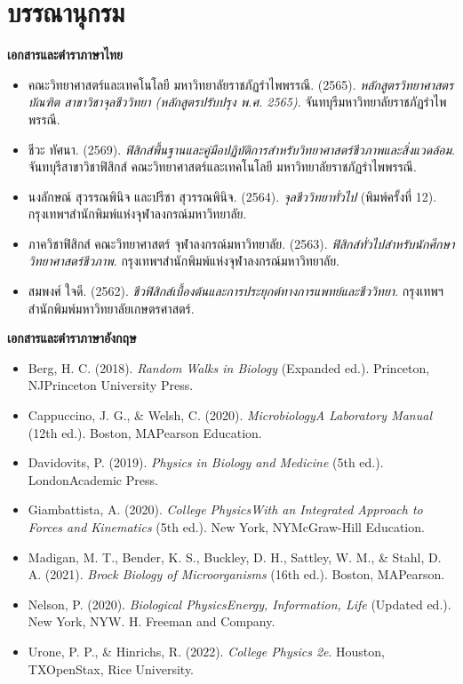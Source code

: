\chapter*{บรรณานุกรม}

\noindent\textbf{เอกสารและตำราภาษาไทย}

\begin{itemize}[leftmargin=1.5cm, itemsep=6pt]
    \item คณะวิทยาศาสตร์และเทคโนโลยี มหาวิทยาลัยราชภัฏรำไพพรรณี. (2565). \textit{หลักสูตรวิทยาศาสตรบัณฑิต สาขาวิชาจุลชีววิทยา (หลักสูตรปรับปรุง พ.ศ. 2565)}. จันทบุรี\quad มหาวิทยาลัยราชภัฏรำไพพรรณี.
    \item ชีวะ ทัศนา. (2569). \textit{ฟิสิกส์พื้นฐานและคู่มือปฏิบัติการสำหรับวิทยาศาสตร์ชีวภาพและสิ่งแวดล้อม}. จันทบุรี\quad สาขาวิชาฟิสิกส์ คณะวิทยาศาสตร์และเทคโนโลยี มหาวิทยาลัยราชภัฏรำไพพรรณี.
    \item นงลักษณ์ สุวรรณพินิจ และปรีชา สุวรรณพินิจ. (2564). \textit{จุลชีววิทยาทั่วไป} (พิมพ์ครั้งที่ 12). กรุงเทพฯ\quad สำนักพิมพ์แห่งจุฬาลงกรณ์มหาวิทยาลัย.
    \item ภาควิชาฟิสิกส์ คณะวิทยาศาสตร์ จุฬาลงกรณ์มหาวิทยาลัย. (2563). \textit{ฟิสิกส์ทั่วไปสำหรับนักศึกษาวิทยาศาสตร์ชีวภาพ}. กรุงเทพฯ\quad สำนักพิมพ์แห่งจุฬาลงกรณ์มหาวิทยาลัย.
    \item สมพงศ์ ใจดี. (2562). \textit{ชีวฟิสิกส์เบื้องต้นและการประยุกต์ทางการแพทย์และชีววิทยา}. กรุงเทพฯ\quad สำนักพิมพ์มหาวิทยาลัยเกษตรศาสตร์.
\end{itemize}

\vspace{0.4cm}
\noindent\textbf{เอกสารและตำราภาษาอังกฤษ}

\begin{itemize}[leftmargin=1.5cm, itemsep=6pt]
    \item Berg, H. C. (2018). \textit{Random Walks in Biology} (Expanded ed.). Princeton, NJ\quad Princeton University Press.
    \item Cappuccino, J. G., \& Welsh, C. (2020). \textit{Microbiology\quad A Laboratory Manual} (12th ed.). Boston, MA\quad Pearson Education.
    \item Davidovits, P. (2019). \textit{Physics in Biology and Medicine} (5th ed.). London\quad Academic Press.
    \item Giambattista, A. (2020). \textit{College Physics\quad With an Integrated Approach to Forces and Kinematics} (5th ed.). New York, NY\quad McGraw-Hill Education.
    \item Madigan, M. T., Bender, K. S., Buckley, D. H., Sattley, W. M., \& Stahl, D. A. (2021). \textit{Brock Biology of Microorganisms} (16th ed.). Boston, MA\quad Pearson.
    \item Nelson, P. (2020). \textit{Biological Physics\quad Energy, Information, Life} (Updated ed.). New York, NY\quad W. H. Freeman and Company.
    \item Urone, P. P., \& Hinrichs, R. (2022). \textit{College Physics 2e}. Houston, TX\quad OpenStax, Rice University.
\end{itemize}
